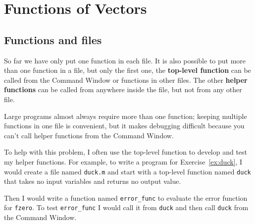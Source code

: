 \documentclass[
]{book}
\numberwithin{Answer}{chapter}
\numberwithin{Exercise}{chapter}
\begin{document}









\chapter{Functions of Vectors}


\section{Functions and files}
\label{sect:funfiles}

So far we have only put one function in each file.  It is also possible
to put more than one function in a file, but only the first one, the
{\bf top-level function} can be called from the {\sf Command
Window} or functions in other files. 
The other {\bf helper functions} can be called from anywhere inside the file, but not from any other file.


Large programs almost always require more than one function; keeping
multiple functions in one file is convenient, but it makes debugging
difficult because you can't call helper functions from the {\sf Command
Window}.


To help with this problem, I often use the top-level function
to develop and test my helper functions.  For example, to write
a program for Exercise~\ref{ex:duck}, I would create a file named
{\tt duck.m} and start with a top-level function named {\tt duck}
that takes no input variables and returns no output value.

Then I would write a function named {\tt error\_func} to
evaluate the error function for {\tt fzero}.  To test
{\tt error\_func} I would call it from {\tt duck} and then
call {\tt duck} from the {\sf Command Window}.
\end{document}
